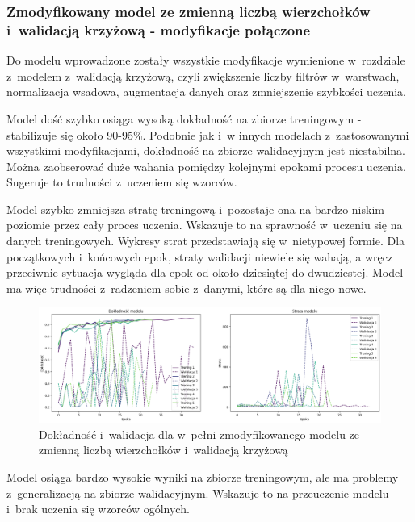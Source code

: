 \subsubsection{Zmodyfikowany model ze zmienną liczbą wierzchołków i~walidacją krzyżową - modyfikacje połączone}

Do modelu wprowadzone zostały wszystkie modyfikacje wymienione w~rozdziale z~modelem z~walidacją krzyżową,
czyli zwiększenie liczby filtrów w~warstwach, normalizacja wsadowa, augmentacja danych oraz zmniejszenie szybkości uczenia.

Model dość szybko osiąga wysoką dokładność na zbiorze treningowym - stabilizuje się około 90-95\%.
Podobnie jak i~w innych modelach z~zastosowanymi wszystkimi modyfikacjami,
dokładność na zbiorze walidacyjnym jest niestabilna.
Można zaobserować duże wahania pomiędzy kolejnymi epokami procesu uczenia.
Sugeruje to trudności z~uczeniem się wzorców.

Model szybko zmniejsza stratę treningową i~pozostaje ona na bardzo niskim poziomie przez cały proces uczenia.
Wskazuje to na sprawność w~uczeniu się na danych treningowych.
Wykresy strat przedstawiają się w~nietypowej formie.
Dla początkowych i~końcowych epok, straty walidacji niewiele się wahają,
a wręcz przeciwnie sytuacja wygląda dla epok od około dziesiątej do dwudziestej.
Model ma więc trudności z~radzeniem sobie z~danymi, które są dla niego nowe.

\begin{figure}[ht]
	\centering
	\includegraphics[width=15.5cm]{resources/tests/images/v4/multiple_edges_crossvalid_img.png}
	\caption{Dokładność i~walidacja dla w~pełni zmodyfikowanego modelu ze zmienną liczbą wierzchołków i~walidacją krzyżową}
	\label{Fig:tests-csvar-2a}
\end{figure}
\FloatBarrier

Model osiąga bardzo wysokie wyniki na zbiorze treningowym,
ale ma problemy z~generalizacją na zbiorze walidacyjnym.
Wskazuje to na przeuczenie modelu i~brak uczenia się wzorców ogólnych.

